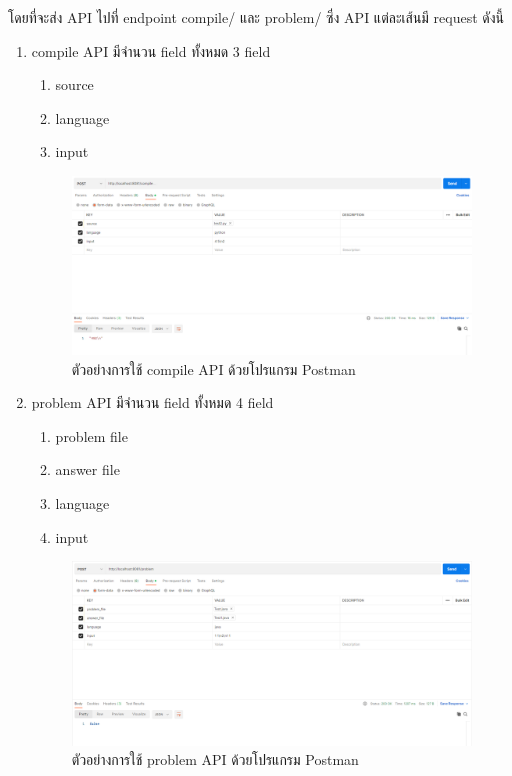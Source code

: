 \raggedright โดยที่จะส่ง API ไปที่ endpoint compile/ และ problem/  ซึ่ง API แต่ละเส้นมี request ดังนี้

\begin{enumerate}
    \item compile API มีจํานวน field ทั้งหมด 3 field
        \begin{enumerate}
            \item source 
            \item language 
            \item input 
        \end{enumerate} 
        
        \begin{figure}[H]
            \centering
                \centering
                \includegraphics[width=5in]{latex/figures/compileAPI.png}
            \caption{ตัวอย่างการใช้ compile API ด้วยโปรแกรม Postman}
        \end{figure}
        
    \item problem API มีจํานวน field ทั้งหมด 4 field
        \begin{enumerate}
            \item problem file 
            \item answer file
            \item language 
            \item input
        \end{enumerate}
        
        \begin{figure}[H]
            \centering
                \centering
                \includegraphics[width=5in]{latex/figures/problemAPI.png}
            \caption{ตัวอย่างการใช้ problem API ด้วยโปรแกรม Postman}
        \end{figure}
\end{enumerate}

        